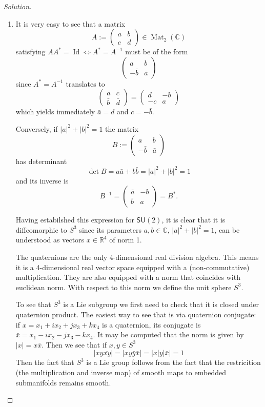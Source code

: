 \begin{proof}[Solution]\leavevmode
	\begin{enumerate}[label=\alph*.]
		\item It is very easy to see that a matrix 
			\[A:=\begin{pmatrix} a &b\\c & d \end{pmatrix} \in\operatorname{Mat}_{2}(\mathbb{C})\]
			satisfying $A A^*=\operatorname{Id}\iff A^*=A^{-1}$ must be of the form
			\[\begin{pmatrix} a &b\\-\bar{b}&\bar{a} \end{pmatrix} \]
			since $A^*=A^{-1}$ translates to
			\[\begin{pmatrix} \bar{a} &\bar{c}\\\bar{b}&\bar{d} \end{pmatrix} =\begin{pmatrix} d&-b\\-c&a\end{pmatrix} \]
			which yields immediately $\bar{a} =d$ and $c=-\bar{b}$.

			Conversely, if $|a|^2+|b|^2=1$ the matrix \[B:=\begin{pmatrix} a &b\\-\bar{b}&\bar{a} \end{pmatrix}\] has determinant
			 \[\det B=a\bar{a}+b \bar{b}=|a|^2+|b|^2=1 \]
			 and its inverse is
			 \[B^{-1}=\begin{pmatrix} \bar{a}&-b\\\bar{b}&a \end{pmatrix} =B^*.\]


			Having estabilshed this expression for $\mathsf{SU}(2)$, it is clear that it is diffeomorphic to $S^3$ since its parameters $a,b\in\mathbb{C}$, $|a|^2+|b|^2=1$, can be understood as vectors $x\in\mathbb{R}^{4}$ of norm 1.

		The quaternions are the only 4-dimensional real division algebra. This means it is a 4-dimensional real vector space equipped with a (non-commutative) multiplication. They are also equipped with a norm that coincides with euclidean norm. With respect to this norm we define the unit sphere $S^3$. 
		
			To see that $S^3$ is a Lie subgroup we first need to check that it is closed under quaternion product. The easiest way to see that is via quaternion conjugate: if $x=x_1+ix_2+jx_3+kx_4$ is a quaternion, its conjugate is $\bar{x}=x_1-ix_2-jx_3-kx_4$. It may be computed that the norm is given by $|x| =x\bar{x}$. Then we see that if $x,y\in S^3$
			\[|xy\overline{xy}|=|xy\bar{y}\bar{x}| =\Big|x|y| \bar{x}\Big|=1\]
			Then the fact that $S^3$ is a Lie group follows from the fact that the restricition (the multiplication and inverse map) of smooth maps to embedded submanifolds remains smooth.


\end{enumerate}
\end{proof}
